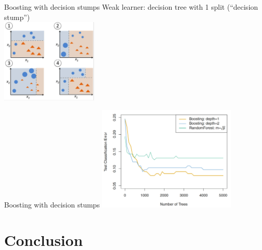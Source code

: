 \documentclass[xcolor=table,aspectratio=169]{beamer}
\newcommand{\referto}[1]{\hfill{\scriptsize{\emph{\color{gray}{#1}}}}}
\begin{document}
\begin{frame}{Boosting with decision stumps}
 Weak learner: decision tree with 1 split (``decision stump'')\\

	\includegraphics[width=0.35\textwidth]{pics/boosting.png}
	\vfill
	\referto{https://sebastianraschka.com/faq/docs/bagging-boosting-rf.html}
\end{frame}

\begin{frame}{Boosting with decision stumps}
	\includegraphics[width=0.5\textwidth]{pics/boosting_result.png}
	
	\referto{ISLR, figure 8.11}
\end{frame}


\section{Conclusion}
\end{document}
